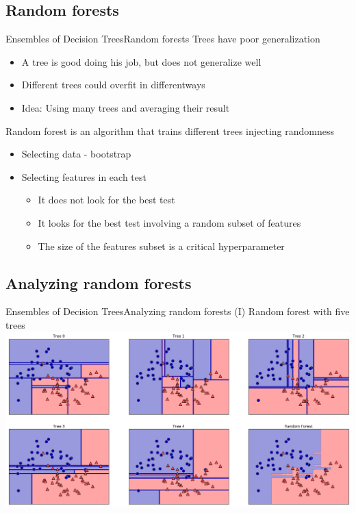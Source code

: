 \documentclass[10pt,compress]{beamer} %
\begin{document}
\subsection{Random forests}
\begin{frame}{Ensembles of Decision Trees}{Random forests}
    Trees have poor generalization
    \begin{itemize}
        \item A tree is good doing his job, but does not generalize well
        \item Different trees could overfit in differentways
        \item Idea: Using many trees and averaging their result
    \end{itemize}

    \alert{Random forest} is an algorithm that trains different trees injecting randomness
    \begin{itemize}
        \item Selecting data - bootstrap
        \item Selecting features in each test
            \begin{itemize}
                \item It does not look for the best test
                \item It looks for the best test involving a random subset of features
                \item The size of the features subset is a critical hyperparameter
            \end{itemize}
    \end{itemize}
\end{frame}

\subsection{Analyzing random forests}
\begin{frame}{Ensembles of Decision Trees}{Analyzing random forests (I)}
    Random forest with five trees\\
    \centering \includegraphics[width=0.8\linewidth]{figs/forest.png}
\end{frame}
\end{document}
